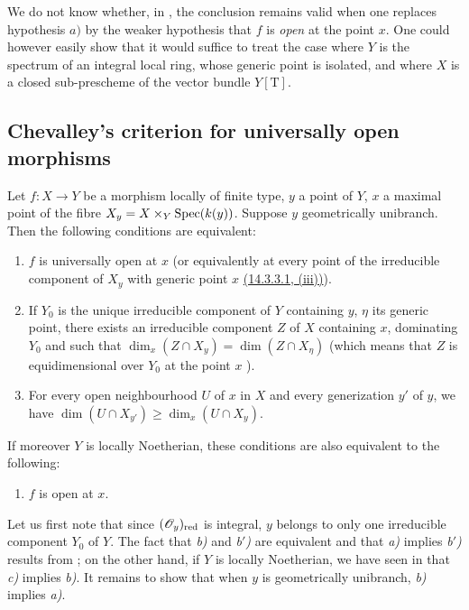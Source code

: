 \begin{remark}[14.3.14]
\label{IV.14.3.14}
We do not know whether, in , the conclusion remains valid when one replaces hypothesis $a)$ by the weaker hypothesis that $f$ is \emph{open} at the point $x$.
One could however easily show that it would suffice to treat the case where $Y$ is the spectrum of an integral local ring, whose generic point is isolated, and where $X$ is a closed sub-prescheme of the vector bundle $Y[\mathrm{T}]$.
\end{remark}
\subsection{Chevalley's criterion for universally open morphisms}
\label{subsection:IV.14.4}

\begin{theorem}[14.4.1]
\label{IV.14.4.1}
Let $f:X\to Y$ be a morphism locally of finite type, $y$ a point of $Y$, $x$ a maximal point of the fibre $X_y=X\times_Y\operatorname{Spec}(k(y))$.
Suppose $y$ geometrically unibranch.
Then the following conditions are equivalent:
\begin{enumerate}[label=\emph{\alph*)}]
  \item $f$ is universally open at $x$ (or equivalently at every point of the irreducible component of $X_y$ with generic point $x$ {\hyperref[IV.14.3.3.1]{(14.3.3.1, (iii))}}).
  \item If $Y_0$ is the unique irreducible component of $Y$ containing $y$, $\eta$ its generic point, there exists an irreducible component $Z$ of $X$ containing $x$, dominating $Y_0$ and such that $\dim_x(Z\cap X_y)=\dim(Z\cap X_\eta)$ (which means that $Z$ is equidimensional over $Y_0$ at the point $x$ ).
  \item[\emph{b$'$)}] For every open neighbourhood $U$ of $x$ in $X$ and every generization $y'$ of $y$, we have $\dim(U\cap X_{y'})\geq\dim_x(U\cap X_y)$.
\end{enumerate}
If moreover $Y$ is locally Noetherian, these conditions are also equivalent to the following:
\begin{enumerate}[label=\emph{\alph*)}]
  \item[\emph{c)}] $f$ is open at $x$.
\end{enumerate}
\end{theorem}

Let us first note that since $(\mathscr{O}_y)_{\mathrm{red}}$ is integral, $y$ belongs to only one irreducible component $Y_0$ of $Y$.
The fact that \emph{b)} and \emph{b$'$)} are equivalent and that \emph{a)} implies \emph{b$'$)} results from ; on the other hand, if $Y$ is locally Noetherian, we have seen in  that \emph{c)} implies \emph{b)}.
It remains to show that when $y$ is geometrically unibranch, \emph{b)} implies \emph{a)}.

